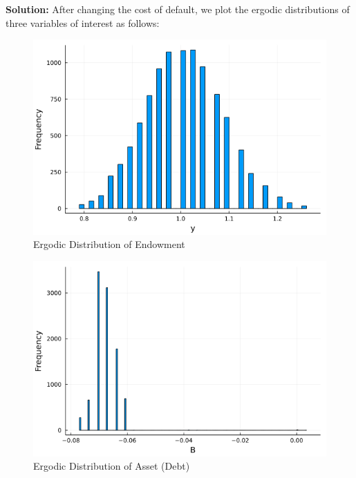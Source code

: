 \documentclass{article}
\begin{document}
	\noindent\textbf{Solution:} After changing the cost of default, we plot the ergodic distributions of three variables of interest as follows:
	
	\begin{figure}[htbp]
		\centering
		\includegraphics[scale=0.5]{endow_histQ5.png}
		\caption{Ergodic Distribution of Endowment}
	\end{figure}
	
	\begin{figure}[htbp]
		\centering
		\includegraphics[scale=0.5]{B_histQ5.png}
		\caption{Ergodic Distribution of Asset (Debt)}
	\end{figure}
	
\end{document}
